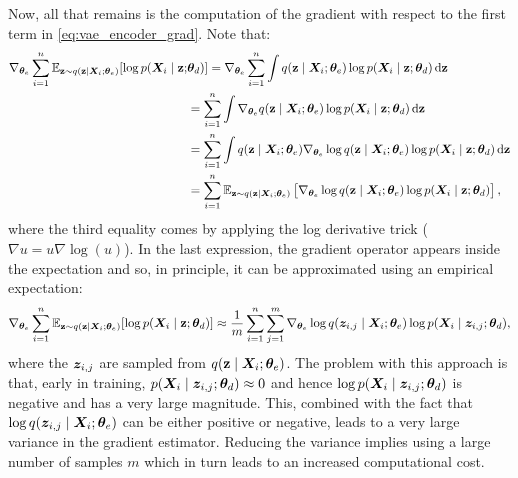 Now, all that remains is the computation of the gradient with respect to the first term in \eqref{eq:vae_encoder_grad}. Note that:
\begingroup
\allowdisplaybreaks
\begin{align}
    \nabla_{{\bm{\theta}}_e} \sum_{i=1}^n \mathbb{E}_{{\mathbf{z}} \sim q({\mathbf{z}} \mid {\bm{X}}_i; {\bm{\theta}}_e)} [\log p({\bm{X}}_i \mid {\mathbf{z}}; &{\bm{\theta}}_d) ] = \nabla_{{\bm{\theta}}_e} \sum_{i=1}^n \int q({\mathbf{z}} \mid {\bm{X}}_i; {\bm{\theta}}_e) \log p({\bm{X}}_i \mid {\mathbf{z}}; {\bm{\theta}}_d) {\,\text{d}} {\mathbf{z}} \nonumber\\
    &= \sum_{i=1}^n \int \nabla_{{\bm{\theta}}_e} q({\mathbf{z}} \mid {\bm{X}}_i; {\bm{\theta}}_e) \log p({\bm{X}}_i \mid {\mathbf{z}}; {\bm{\theta}}_d) {\,\text{d}} {\mathbf{z}} \nonumber\\
    &= \sum_{i=1}^n \int q({\mathbf{z}} \mid {\bm{X}}_i; {\bm{\theta}}_e) \nabla_{{\bm{\theta}}_e} \log q({\mathbf{z}} \mid {\bm{X}}_i; {\bm{\theta}}_e) \log p({\bm{X}}_i \mid {\mathbf{z}}; {\bm{\theta}}_d) {\,\text{d}} {\mathbf{z}} \nonumber\\
    &= \sum_{i=1}^n \mathbb{E}_{{\mathbf{z}} \sim q({\mathbf{z}} \mid {\bm{X}}_i; {\bm{\theta}}_e)} \left[\nabla_{{\bm{\theta}}_e} \log q({\mathbf{z}} \mid {\bm{X}}_i; {\bm{\theta}}_e) \log p({\bm{X}}_i \mid {\mathbf{z}}; {\bm{\theta}}_d)\right],
\end{align}
\endgroup
where the third equality comes by applying the log derivative trick ($\nabla u = u \nabla \log(u)$). In the last expression, the gradient operator appears inside the expectation and so, in principle, it can be approximated using an empirical expectation:
\begin{equation}
    \nabla_{{\bm{\theta}}_e} \sum_{i=1}^n \mathbb{E}_{{\mathbf{z}} \sim q({\mathbf{z}} \mid {\bm{X}}_i; {\bm{\theta}}_e)} [\log p({\bm{X}}_i \mid {\mathbf{z}}; {\bm{\theta}}_d) ] \approx \frac{1}{m} \sum_{i=1}^n \sum_{j=1}^m \nabla_{{\bm{\theta}}_e} \log q({\bm{z}}_{i,j} \mid {\bm{X}}_i; {\bm{\theta}}_e) \log p({\bm{X}}_i \mid {\bm{z}}_{i,j}; {\bm{\theta}}_d),
\end{equation}
where the ${\bm{z}}_{i,j}$ are sampled from $q({\mathbf{z}} \mid {\bm{X}}_i; {\bm{\theta}}_e)$. The problem with this approach is that, early in training, $p({\bm{X}}_i \mid {\bm{z}}_{i,j}; {\bm{\theta}}_d) \approx 0$ and hence $\log p({\bm{X}}_i \mid {\bm{z}}_{i,j}; {\bm{\theta}}_d)$ is negative and has a very large magnitude. This, combined with the fact that $\log q({\bm{z}}_{i,j} \mid {\bm{X}}_i; {\bm{\theta}}_e)$ can be either positive or negative, leads to a very large variance in the gradient estimator. Reducing the variance implies using a large number of samples $m$ which in turn leads to an increased computational cost.


